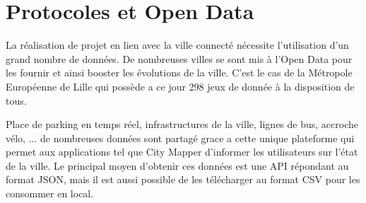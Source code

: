 













\section{Protocoles et Open Data}

La réalisation de projet en lien avec la ville connecté nécessite l'utilisation d'un grand nombre de données.
De nombreuses villes se sont mis à l'Open Data pour les fournir et ainsi booster les évolutions de la ville.
C'est le cas de la Métropole Européenne de Lille qui possède a ce jour 298 jeux de donnée à la disposition de tous.

Place de parking en temps réel, infrastructures de la ville, lignes de bus, accroche vélo, ... de nombreuses
données sont partagé grace a cette unique plateforme qui permet aux applications tel que City Mapper
d'informer les utilisateurs sur l'état de la ville.
Le principal moyen d'obtenir ces données est une API répondant au format JSON, mais il est aussi possible de les
télécharger au format CSV pour les consommer en local.

